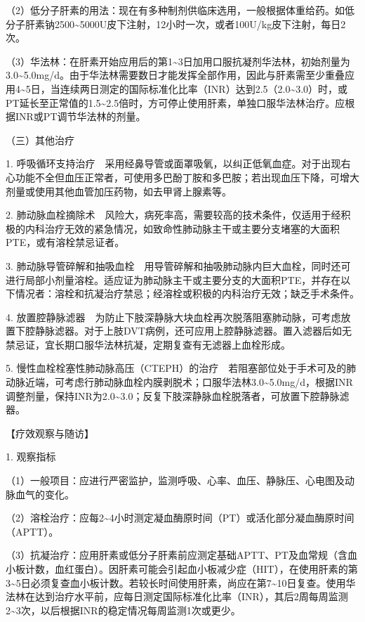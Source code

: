（2）低分子肝素的用法：现在有多种制剂供临床选用，一般根据体重给药。如低分子肝素钠2500\textasciitilde{}5000U皮下注射，12小时一次，或者100U/kg皮下注射，每日2次。

（3）华法林：在肝素开始应用后的第1\textasciitilde{}3日加用口服抗凝剂华法林，初始剂量为3.0\textasciitilde{}5.0mg/d。由于华法林需要数日才能发挥全部作用，因此与肝素需至少重叠应用4\textasciitilde{}5日，当连续两日测定的国际标准化比率（INR）达到2.5（2.0\textasciitilde{}3.0）时，或PT延长至正常值的1.5\textasciitilde{}2.5倍时，方可停止使用肝素，单独口服华法林治疗。应根据INR或PT调节华法林的剂量。

{（三）其他治疗}

1.
呼吸循环支持治疗　采用经鼻导管或面罩吸氧，以纠正低氧血症。对于出现右心功能不全但血压正常者，可使用多巴酚丁胺和多巴胺；若出现血压下降，可增大剂量或使用其他血管加压药物，如去甲肾上腺素等。

2.
肺动脉血栓摘除术　风险大，病死率高，需要较高的技术条件，仅适用于经积极的内科治疗无效的紧急情况，如致命性肺动脉主干或主要分支堵塞的大面积PTE，或有溶栓禁忌证者。

3.
肺动脉导管碎解和抽吸血栓　用导管碎解和抽吸肺动脉内巨大血栓，同时还可进行局部小剂量溶栓。适应证为肺动脉主干或主要分支的大面积PTE，并存在以下情况者：溶栓和抗凝治疗禁忌；经溶栓或积极的内科治疗无效；缺乏手术条件。

4.
放置腔静脉滤器　为防止下肢深静脉大块血栓再次脱落阻塞肺动脉，可考虑放置下腔静脉滤器。对于上肢DVT病例，还可应用上腔静脉滤器。置入滤器后如无禁忌证，宜长期口服华法林抗凝，定期复查有无滤器上血栓形成。

5.
慢性血栓栓塞性肺动脉高压（CTEPH）的治疗　若阻塞部位处于手术可及的肺动脉近端，可考虑行肺动脉血栓内膜剥脱术；口服华法林3.0\textasciitilde{}5.0mg/d，根据INR调整剂量，保持INR为2.0\textasciitilde{}3.0；反复下肢深静脉血栓脱落者，可放置下腔静脉滤器。

【疗效观察与随访】

1. 观察指标

（1）一般项目：应进行严密监护，监测呼吸、心率、血压、静脉压、心电图及动脉血气的变化。

（2）溶栓治疗：应每2\textasciitilde{}4小时测定凝血酶原时间（PT）或活化部分凝血酶原时间（APTT）。

（3）抗凝治疗：应用肝素或低分子肝素前应测定基础APTT、PT及血常规（含血小板计数，血红蛋白）。因肝素可能会引起血小板减少症（HIT），在使用肝素的第3\textasciitilde{}5日必须复查血小板计数。若较长时间使用肝素，尚应在第7\textasciitilde{}10日复查。使用华法林在达到治疗水平前，应每日测定国际标准化比率（INR），其后2周每周监测2\textasciitilde{}3次，以后根据INR的稳定情况每周监测1次或更少。

